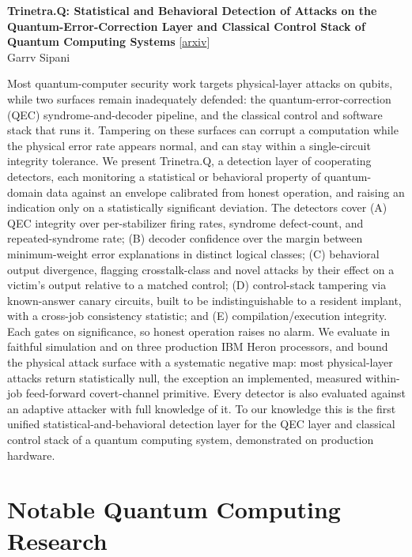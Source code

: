 \documentclass[12pt,letterpaper]{article}
\begin{document}
{\small\textbf{Trinetra.Q: Statistical and Behavioral Detection of Attacks on the Quantum-Error-Correction Layer and Classical Control Stack of Quantum Computing Systems}} {\scriptsize[\href{https://arxiv.org/abs/2611.05722}{arxiv}]}\nopagebreak\\
{\scriptsize Garrv Sipani}\nopagebreak\\[2pt]
{\footnotesize Most quantum-computer security work targets physical-layer attacks on qubits, while two surfaces remain inadequately defended: the quantum-error-correction (QEC) syndrome-and-decoder pipeline, and the classical control and software stack that runs it. Tampering on these surfaces can corrupt a computation while the physical error rate appears normal, and can stay within a single-circuit integrity tolerance. We present Trinetra.Q, a detection layer of cooperating detectors, each monitoring a statistical or behavioral property of quantum-domain data against an envelope calibrated from honest operation, and raising an indication only on a statistically significant deviation. The detectors cover (A) QEC integrity over per-stabilizer firing rates, syndrome defect-count, and repeated-syndrome rate; (B) decoder confidence over the margin between minimum-weight error explanations in distinct logical classes; (C) behavioral output divergence, flagging crosstalk-class and novel attacks by their effect on a victim's output relative to a matched control; (D) control-stack tampering via known-answer canary circuits, built to be indistinguishable to a resident implant, with a cross-job consistency statistic; and (E) compilation/execution integrity. Each gates on significance, so honest operation raises no alarm. We evaluate in faithful simulation and on three production IBM Heron processors, and bound the physical attack surface with a systematic negative map: most physical-layer attacks return statistically null, the exception an implemented, measured within-job feed-forward covert-channel primitive. Every detector is also evaluated against an adaptive attacker with full knowledge of it. To our knowledge this is the first unified statistical-and-behavioral detection layer for the QEC layer and classical control stack of a quantum computing system, demonstrated on production hardware.\par}
\medskip


\section*{Notable Quantum Computing Research}
\end{document}
